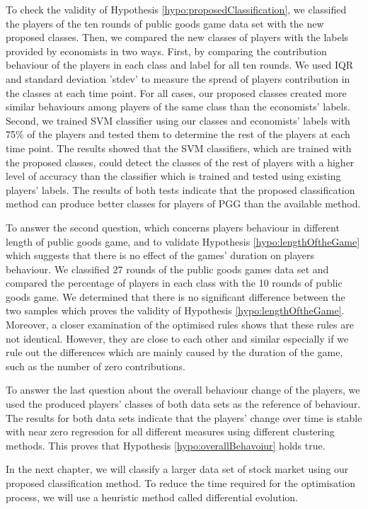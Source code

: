 To check the validity of Hypothesis \ref{hypo:proposedClassification}, we classified the players of the ten rounds of public goods game data set with the new proposed classes. Then, we compared the new classes of players with the labels provided by economists in two ways. First,  by comparing the contribution behaviour of the players in each class and label for all ten rounds. We used IQR and standard deviation 'stdev' to measure the spread of players contribution in the classes at each time point. For all cases, our proposed classes created more similar behaviours among players of the same class than the economists' labels. Second, we trained SVM classifier using our classes and economists' labels with 75\% of the players and tested them to determine the rest of the players at each time point. The results showed that the SVM classifiers, which are trained with the proposed classes, could detect the classes of the rest of players with a higher level of accuracy than the classifier which is trained and tested using existing players' labels. The results of both tests indicate that the proposed classification method can produce better classes for players of PGG than the available method.

To answer the second question, which concerns players behaviour in different length of public goods game, and to validate Hypothesis \ref{hypo:lengthOftheGame} which suggests that there is no effect of the games' duration on players behaviour. We classified 27 rounds of the public goods games data set and compared the percentage of players in each class with the 10 rounds of public goods game. We determined that there is no significant difference between the two samples which proves the validity of Hypothesis \ref{hypo:lengthOftheGame}. Moreover, a closer examination of the optimised rules shows that these rules are not identical. However, they are close to each other and similar especially if we rule out the differences which are mainly caused by the duration of the game, such as the number of zero contributions.

To answer the last question about the overall behaviour change of the players, we used the produced players' classes of both data sets as the reference of behaviour. The results for both data sets indicate that the players' change over time is stable with near zero regression for all different measures using different clustering methods. This proves that Hypothesis \ref{hypo:overallBehavoiur} holds true.

In the next chapter, we will classify a larger data set of stock market using our proposed classification method. To reduce the time required for the optimisation process, we will use a heuristic method called differential evolution.



